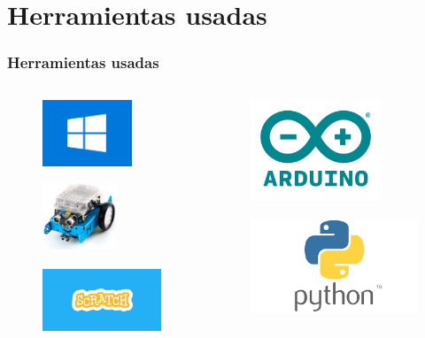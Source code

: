 \documentclass{beamer}
\begin{document}
\section{Herramientas usadas}
\begin{frame}
\frametitle{Herramientas usadas}


\begin{columns}
	\begin{column}{0.5\textwidth}
		\begin{figure}
		\centering
		\includegraphics[height=2cm]{Windows.jpg}
		\end{figure}
		\begin{figure}
			\centering
			\includegraphics[height=2cm]{mbot.jpg}
		\end{figure}
		\begin{figure}
			\centering
			\includegraphics[height=2cm]{scratch-logo.png}
		\end{figure}
	\end{column}
	\begin{column}{0.5\textwidth}
		\centering
		\begin{figure}
		\centering
		\includegraphics[height=3cm]{arduino-logo.png}
		\end{figure}
		\begin{figure}
			\centering
		\includegraphics[height=3cm]{python-logo.png}
		\end{figure}
	\end{column}
\end{columns}


\end{frame}
\end{document}
